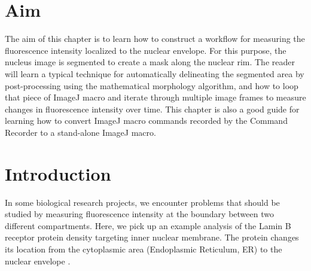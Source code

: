 \setcounter{chapter}{0}


\section{Aim}

The aim of this chapter is to learn how to construct a workflow for measuring the fluorescence intensity localized to the nuclear envelope. For this purpose, the nucleus image is segmented to create a mask along the nuclear rim. The reader will learn a typical technique for automatically delineating the segmented area by post-processing using the mathematical morphology algorithm, and how to loop that piece of ImageJ macro and iterate through multiple image frames to measure changes in fluorescence intensity over time. This chapter is also a good guide for learning how to convert ImageJ macro commands recorded by the Command Recorder to a stand-alone ImageJ macro.  

\section{Introduction}


In some biological research projects, we encounter problems that should be studied by measuring fluorescence intensity at the boundary between two different compartments. Here, we pick up an example analysis of the Lamin B receptor protein density targeting inner nuclear membrane. The protein changes its location from the cytoplasmic area (Endoplasmic Reticulum, ER) to the nuclear envelope \citep{Boni2015}. 

